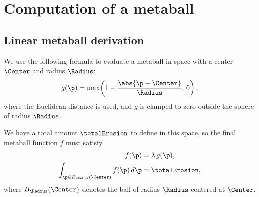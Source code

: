 



\chapter{Computation of a metaball}
\label{sec:erosion-appendix_metaball}


\section{Linear metaball derivation}

We use the following formula to evaluate a metaball in space with a center $\Center$ and radius $\Radius$:
\begin{equation}
    g(\p) = \max\!\left(1 - \frac{\abs{\p - \Center}}{\Radius},\,0\right),
\end{equation}
where the Euclidean distance is used, and $g$ is clamped to zero outside the sphere of radius $\Radius$.

We have a total amount $\totalErosion$ to define in this space, so the final metaball function $f$ must satisfy
\begin{align}
    \label{eq:erosion-function_f_is_metaball}
    f(\p) &= \lambda\, g(\p), \\
    \label{eq:erosion-int_function_f_is_erosion}
    \int_{\p \in B_{\Radius}(\Center)} f(\p) \, d\p &= \totalErosion,
\end{align}
where $B_{\Radius}(\Center)$ denotes the ball of radius $\Radius$ centered at $\Center$.

